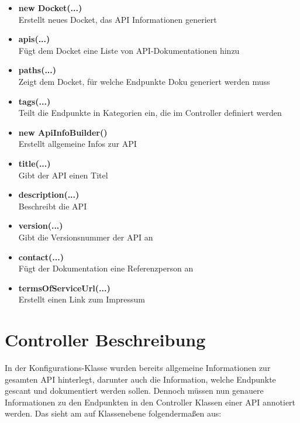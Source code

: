 \begin{itemize}
\item \textbf{new Docket(...)}\\
Erstellt neues Docket, das \ac{API} Informationen generiert
\item \textbf{apis(...)}\\
Fügt dem Docket eine Liste von \ac{API}-Dokumentationen hinzu
\item \textbf{paths(...)}\\
Zeigt dem Docket, für welche Endpunkte Doku generiert werden muss
\item \textbf{tags(...)}\\
Teilt die Endpunkte in Kategorien ein, die im Controller definiert werden
\item \textbf{new ApiInfoBuilder()}\\
Erstellt allgemeine Infos zur \ac{API}
\item \textbf{title(...)}\\
Gibt der \ac{API} einen Titel
\item \textbf{description(...)}\\
Beschreibt die \ac{API}
\item \textbf{version(...)}\\
Gibt die Versionsnummer der \ac{API} an
\item \textbf{contact(...)}\\
Fügt der Dokumentation eine Referenzperson an
\item \textbf{termsOfServiceUrl(...)}\\
Erstellt einen Link zum Impressum
\end{itemize}

\section{Controller Beschreibung}

In der Konfigurations-Klasse wurden bereits allgemeine Informationen zur gesamten \ac{API} hinterlegt, darunter auch die Information, welche Endpunkte gescant und dokumentiert werden sollen. Dennoch müssen nun genauere Informationen zu den Endpunkten in den Controller Klassen einer \ac{API} annotiert werden. Das sieht am auf Klassenebene folgendermaßen aus:

